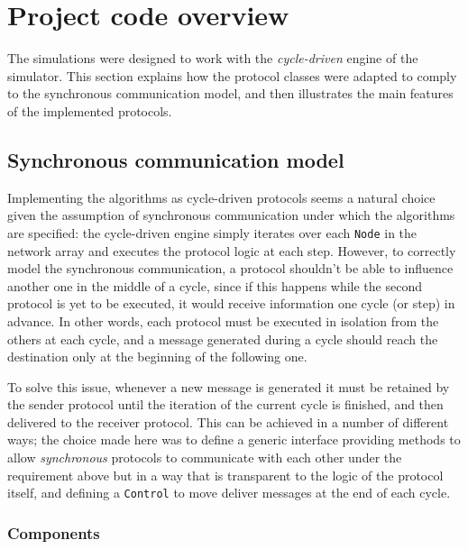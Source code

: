 
\section{Project code overview}


The simulations were designed to work with the \emph{cycle-driven} engine of the \peersim{} \cite{peersim} simulator. This section explains how the protocol classes were adapted to comply to the synchronous communication model, and then illustrates the main features of the implemented protocols.

\subsection{Synchronous communication model}

Implementing the algorithms as cycle-driven protocols seems a natural choice given the assumption of synchronous communication under which the algorithms are specified: the cycle-driven engine simply iterates over each \texttt{Node} in the network array and executes the protocol logic at each step. However, to correctly model the synchronous communication, a protocol shouldn't be able to influence another one in the middle of a cycle, since if this happens while the second protocol is yet to be executed, it would receive information one cycle (or step) in advance. In other words, each protocol must be executed in isolation from the others at each cycle, and a message generated during a cycle should reach the destination only at the beginning of the following one.

To solve this issue, whenever a new message is generated it must be retained by the sender protocol until the iteration of the current cycle is finished, and then delivered to the receiver protocol. This can be achieved in a number of different ways; the choice made here was to define a generic interface providing methods to allow \emph{synchronous} protocols to communicate with each other under the requirement above but in a way that is transparent to the logic of the protocol itself, and defining a \peersim{} \texttt{Control} to move deliver messages at the end of each cycle.

\subsubsection{Components}


